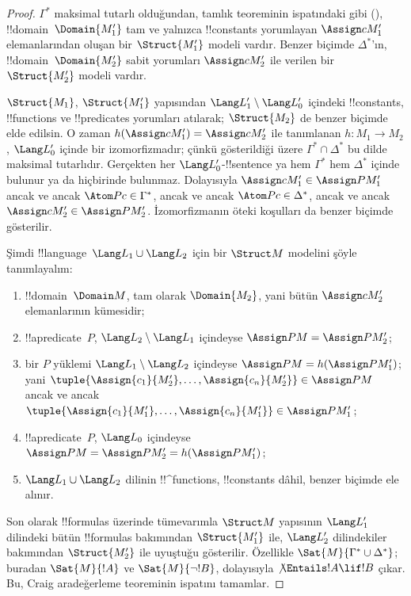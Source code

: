 \begin{proof}
$\Gamma^*$ maksimal tutarlı olduğundan, tamlık teoreminin ispatındaki
gibi (), !!{domain}~$\Domain{M'_1}$
tam ve yalnızca !!{constant}s yorumlayan $\Assign c{M'_1}$
elemanlarından oluşan bir $\Struct{M'_1}$ modeli vardır. Benzer biçimde
$\Delta^*$'ın, !!{domain}~$\Domain{M'_2}$ sabit yorumları
$\Assign c{M'_2}$ ile verilen bir $\Struct{M'_2}$ modeli vardır.

$\Struct{M_1}$, $\Struct{M'_1}$ yapısından
$\Lang L'_1\setminus\Lang L'_0$ içindeki !!{constant}s, !!{function}s
ve !!{predicate}s yorumları atılarak; $\Struct{M_2}$ de benzer biçimde
elde edilsin. O zaman
$h(\Assign c{M'_1})=\Assign c{M'_2}$ ile tanımlanan
$h\colon M_1\to M_2$, $\Lang L'_0$ içinde bir izomorfizmadır; çünkü
gösterildiği üzere $\Gamma^*\cap\Delta^*$ bu dilde maksimal tutarlıdır.
Gerçekten her $\Lang L'_0$-!!{sentence} ya hem $\Gamma^*$ hem
$\Delta^*$ içinde bulunur ya da hiçbirinde bulunmaz. Dolayısıyla
$\Assign c{M'_1}\in\Assign P{M'_1}$ ancak ve ancak
$\Atom P c\in\Gamma^*$, ancak ve ancak $\Atom P c\in\Delta^*$, ancak
ve ancak $\Assign c{M'_2}\in\Assign P{M'_2}$. İzomorfizmanın öteki
koşulları da benzer biçimde gösterilir.

Şimdi !!{language}~$\Lang L_1\cup\Lang L_2$ için bir $\Struct M$
modelini şöyle tanımlayalım:
\begin{enumerate}
\item !!{domain}~$\Domain M$, tam olarak $\Domain{M_2}$, yani bütün
  $\Assign c{M'_2}$ elemanlarının kümesidir;
\item !!a{predicate}~$P$, $\Lang L_2\setminus\Lang L_1$ içindeyse
  $\Assign P M=\Assign P{M'_2}$;
\item bir $P$ yüklemi $\Lang L_1\setminus\Lang L_2$ içindeyse
  $\Assign P M=h(\Assign P{M'_1})$; yani
  $\tuple{\Assign{c_1}{M'_2},\dots,\Assign{c_n}{M'_2}}\in\Assign P M$
  ancak ve ancak
  $\tuple{\Assign{c_1}{M'_1},\dots,\Assign{c_n}{M'_1}}\in\Assign P{M'_1}$;
\item !!a{predicate}~$P$, $\Lang L_0$ içindeyse
  $\Assign P M=\Assign P{M'_2}=h(\Assign P{M'_1})$;
\item $\Lang L_1\cup\Lang L_2$ dilinin !!^{function}s, !!{constant}s
  dâhil, benzer biçimde ele alınır.
\end{enumerate}

Son olarak !!{formula}s üzerinde tümevarımla $\Struct M$ yapısının
$\Lang L'_1$ dilindeki bütün !!{formula}s bakımından $\Struct{M'_1}$
ile, $\Lang L'_2$ dilindekiler bakımından $\Struct{M'_2}$ ile
uyuştuğu gösterilir. Özellikle
$\Sat{M}{\Gamma^*\cup\Delta^*}$; buradan $\Sat{M}{!A}$ ve
$\Sat{M}{\lnot !B}$, dolayısıyla $\not\Entails !A\lif !B$ çıkar.
Bu, Craig aradeğerleme teoreminin ispatını tamamlar.
\end{proof}

